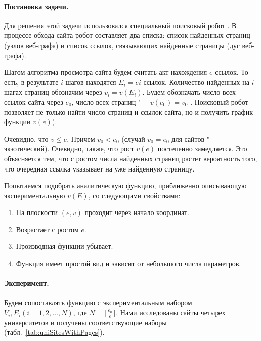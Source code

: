 \paragraph{Постановка задачи.} Для решения этой задачи использовался специальный поисковый робот \cite{BlekanovSergeevMartynenko}. В процессе обхода сайта робот составляет два списка: список найденных страниц (узлов веб-графа) и список ссылок, связывающих найденные страницы (дуг веб-графа).

Шагом алгоритма просмотра сайта будем считать акт нахождения \(e\) ссылок. То есть, в результате \(i\) шагов находятся \(E_i = ei\) ссылок. Количество найденных на \(i\) шагах страниц обозначим через \(v_i = v(E_i)\). Будем обозначать число всех ссылок сайта через \(e_0\), число всех страниц "--- \(v(e_0) = v_0\) . Поисковый робот позволяет не только найти число страниц и ссылок сайта, но и получить график функции \(v(e)\)).

Очевидно, что \(v \leq e \). Причем \(v_0 < e_0\) (случай \(v_0 = e_0\) для сайтов "--- экзотический). Очевидно, также, что рост \(v(e)\) постепенно замедляется. Это объясняется тем, что с ростом числа найденных страниц растет вероятность того, что очередная ссылка указывает на уже найденную страницу. 

Попытаемся подобрать аналитическую функцию, приближенно описывающую экспериментальную \(v(E)\), со следующими свойствами:
\begin{enumerate}
	\item На плоскости \((e, v)\) проходит через начало координат.
	\item Возрастает с ростом \(e\).
	\item Производная функции убывает.
	\item Функция имеет простой вид и зависит от небольшого числа параметров.
\end{enumerate}

\paragraph{Эксперимент.} Будем сопоставлять функцию с экспериментальным набором \(V_i, E_i (i = 1,2, \dots, N)\), где \(N = \lceil \frac{e_0}{e} \rceil\). Нами исследованы сайты четырех университетов и получены соответствующие наборы (табл.~\cref{tab:uniSitesWithPages}).

